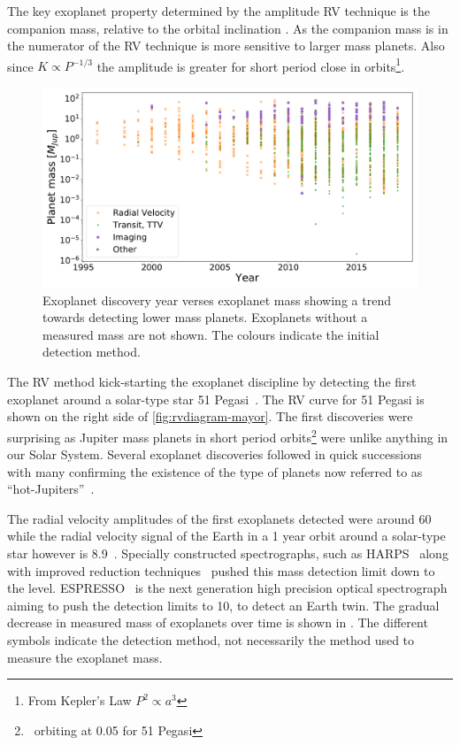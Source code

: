 The key exoplanet property determined by the amplitude {RV} technique is the companion mass, relative to the orbital inclination \Mpsini.
As the companion mass is in the numerator of  the {RV} technique is more sensitive to larger mass planets.
Also since $K \propto P^{-1/3}$ the amplitude is greater for short period close in orbits\footnote{From Kepler's Law ${P}^{2}\propto {a}^{3}$}.

\begin{figure}
    \centering
    \includegraphics[width=0.7\linewidth]{figures/introduction/exoplanetEU_year_mass.pdf}
    \caption{Exoplanet discovery year verses exoplanet mass showing a trend towards detecting lower mass planets. Exoplanets without a measured mass are not shown. The colours indicate the initial detection method.}
    \label{fig:exoplaneteuyearmass}
\end{figure}

The RV method  kick-starting the exoplanet discipline by detecting the first exoplanet around a solar-type star {51 Pegasi}~\citep{mayor_jupitermass_1995}. The RV curve for {51 Pegasi} is shown on the right side of \ref{fig:rvdiagram-mayor}.
The first discoveries were surprising as Jupiter mass planets in short period orbits\footnote{\,\Mjup{} orbiting at 0.05\AU{} for {51 Pegasi}} were unlike anything in our Solar System.
Several exoplanet discoveries followed in quick successions~\citep[e.g.][]{butler_planet_1996, marcy_planetary_1996} with many confirming the existence of the type of planets now referred to as ``hot-Jupiters''~\citep{butler_three_1997, charbonneau_detection_2000}.

The radial velocity amplitudes of the first exoplanets detected were around 60\mps{} while
the radial velocity signal of the Earth in a 1 year orbit around a solar-type star however is 8.9\cmps{}~\citep{figueira_radial_2010}.
Specially constructed spectrographs, such as HARPS~\citep{mayor_setting_2003} along with improved reduction techniques~\citep{lovis_new_2007} pushed this mass detection limit down to the \mps{} level. ESPRESSO~\citep{pepe_espresso_2014, megevand_espresso_2014} is the next generation high precision optical spectrograph aiming to push the detection limits to 10\cmps, to detect an Earth twin.
The gradual decrease in measured mass of exoplanets over time is shown in . The different symbols indicate the detection method, not necessarily the method used to measure the exoplanet mass.

